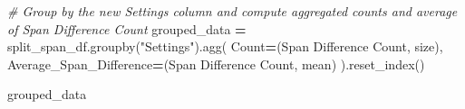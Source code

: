 \documentclass[
]{article}
\newenvironment{Shaded}{\begin{snugshade}}{\end{snugshade}}
\newcommand{\CommentTok}[1]{\textcolor[rgb]{0.56,0.35,0.01}{\textit{#1}}}
\newcommand{\NormalTok}[1]{#1}
\newcommand{\OperatorTok}[1]{\textcolor[rgb]{0.81,0.36,0.00}{\textbf{#1}}}
\newcommand{\StringTok}[1]{\textcolor[rgb]{0.31,0.60,0.02}{#1}}
\begin{document}
\begin{Shaded}
\begin{Highlighting}[]
\CommentTok{\# Group by the new \textquotesingle{}Settings\textquotesingle{} column and compute aggregated counts and average of \textquotesingle{}Span Difference Count\textquotesingle{}}
\NormalTok{grouped\_data }\OperatorTok{=}\NormalTok{ split\_span\_df.groupby(}\StringTok{"Settings"}\NormalTok{).agg(}
\NormalTok{    Count}\OperatorTok{=}\NormalTok{(}\StringTok{\textquotesingle{}Span Difference Count\textquotesingle{}}\NormalTok{, }\StringTok{\textquotesingle{}size\textquotesingle{}}\NormalTok{),}
\NormalTok{    Average\_Span\_Difference}\OperatorTok{=}\NormalTok{(}\StringTok{\textquotesingle{}Span Difference Count\textquotesingle{}}\NormalTok{, }\StringTok{\textquotesingle{}mean\textquotesingle{}}\NormalTok{)}
\NormalTok{).reset\_index()}

\NormalTok{grouped\_data}
\end{Highlighting}
\end{Shaded}
\end{document}
